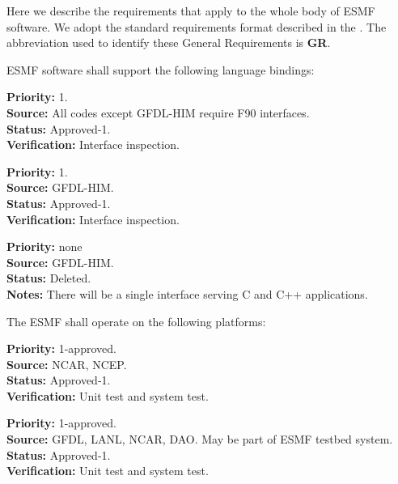 
Here we describe the requirements that apply to the whole body of 
ESMF software.  We adopt the standard requirements format described in 
the .  The abbreviation used to identify
these General Requirements is {\bf GR}.


ESMF software shall support the following language bindings:

\begin{reqlist}
{\bf Priority:} 1. \\
{\bf Source:} All codes except GFDL-HIM require F90 interfaces. \\
{\bf Status:} Approved-1. \\
{\bf Verification:} Interface inspection. 
\end{reqlist}

\begin{reqlist}
{\bf Priority:} 1. \\
{\bf Source:} GFDL-HIM. \\
{\bf Status:} Approved-1. \\
{\bf Verification:} Interface inspection.
\end{reqlist}

\begin{reqlist}
  {\bf Priority:} none \\
  {\bf Source:} GFDL-HIM. \\
  {\bf Status:} Deleted. \\
  {\bf Notes:} There will be a single interface serving C and C++
  applications.
\end{reqlist}

The ESMF shall operate on the following platforms:

\begin{reqlist}
{\bf Priority:} 1-approved. \\
{\bf Source:} NCAR, NCEP. \\
{\bf Status:} Approved-1. \\
{\bf Verification:} Unit test and system test.
\end{reqlist}

\begin{reqlist}
{\bf Priority:} 1-approved. \\
{\bf Source:} GFDL, LANL, NCAR, DAO.  May be part of ESMF testbed system. \\
{\bf Status:} Approved-1. \\
{\bf Verification:} Unit test and system test.
\end{reqlist}

